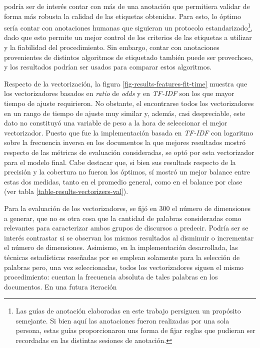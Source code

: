 podr\'ia ser de inter\'es contar con m\'as de una anotaci\'on que
permitiera validar de forma m\'as robusta la calidad de las etiquetas
obtenidas. Para esto, lo \'optimo ser\'ia contar con anotaciones
humanas que siguieran un protocolo estandarizado\footnote{Las gu\'ias
de anotaci\'on elaboradas en este trabajo persiguen un prop\'osito
semejante. Si bien aqu\'i las anotaciones fueron realizadas por una sola
persona, estas gu\'ias proporcionaron uns forma de fijar reglas que
pudieran ser recordadas en las distintas sesiones de anotaci\'on.}, dado
que esto permite un mejor control de los criterios de las 
etiquetas a utilizar y la fiabilidad del procedimiento. Sin embargo,
contar con anotaciones provenientes de distintos algoritmos de etiquetado
tambi\'en puede ser provechoso, y los resultados podr\'ian ser usados
para comparar estos algoritmos.
\par
Respecto de la vectorizaci\'on, la figura \ref{fig-results-features-fit-time}
muestra que los vectorizadores basados en \textit{ratio} de \textit{odds}
y en \textit{TF-IDF} son los que mayor tiempo de ajuste requirieron. No
obstante, el encontrarse todos los vectorizadores en un rango de tiempo
de ajuste muy similar y, adem\'as, casi despreciable, este dato no
constituy\'o una variable de peso a la hora de seleccionar el mejor vectorizador.
Puesto que fue la implementaci\'on basada en \textit{TF-IDF} con
logaritmo sobre la frecuencia inversa en los documentos la que
mejores resultados mostr\'o respecto de las m\'etricas de evaluaci\'on consideradas,
se opt\'o por esta vectorizador para el modelo final. Cabe destacar que, si bien
sus resultads respecto de la precisi\'on y la cobertura no fueron los \'optimos,
s\'i mostr\'o un mejor balance entre estas dos medidas, tanto en el promedio
general, como en el balance por clase (ver tabla \ref{table-results-vectorizers-val}).
\par
Para la evaluaci\'on de los vectorizadores, se fij\'o en $300$
el n\'umero de dimensiones a generar, que no es otra cosa que la
cantidad de palabras consideradas como relevantes para caracterizar
ambos grupos de discursos a predecir. Podr\'ia
ser se inter\'es contrastar si se observan los mismos resultados al
disminuir o incrementar el n\'umero de dimensiones. Asimismo, en la
implementaci\'on desarrollada, las t\'ecnicas estad\'isticas reseñadas por
\cite{monroe2008fightin} se emplean solamente
para la selecci\'on de palabras pero, una vez seleccionadas, todos
los vectorizadores siguen el mismo procedimiento: cuentan la frecuencia
absoluta de tales palabras en los documentos. En una futura iteraci\'on

